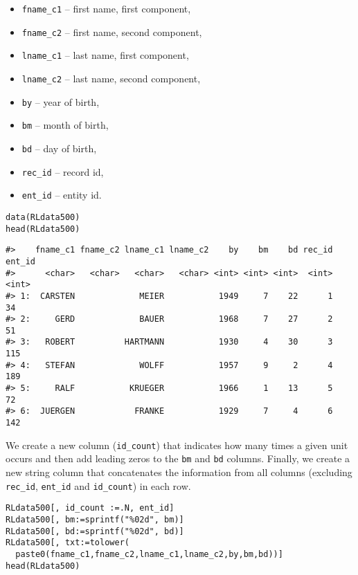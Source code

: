 \begin{itemize}
\tightlist
\item
  \texttt{fname\_c1} -- first name, first component,
\item
  \texttt{fname\_c2} -- first name, second component,
\item
  \texttt{lname\_c1} -- last name, first component,
\item
  \texttt{lname\_c2} -- last name, second component,
\item
  \texttt{by} -- year of birth,
\item
  \texttt{bm} -- month of birth,
\item
  \texttt{bd} -- day of birth,
\item
  \texttt{rec\_id} -- record id,
\item
  \texttt{ent\_id} -- entity id.
\end{itemize}

\begin{verbatim}
data(RLdata500)
head(RLdata500)
\end{verbatim}

\begin{verbatim}
#>    fname_c1 fname_c2 lname_c1 lname_c2    by    bm    bd rec_id ent_id
#>      <char>   <char>   <char>   <char> <int> <int> <int>  <int>  <int>
#> 1:  CARSTEN             MEIER           1949     7    22      1     34
#> 2:     GERD             BAUER           1968     7    27      2     51
#> 3:   ROBERT          HARTMANN           1930     4    30      3    115
#> 4:   STEFAN             WOLFF           1957     9     2      4    189
#> 5:     RALF           KRUEGER           1966     1    13      5     72
#> 6:  JUERGEN            FRANKE           1929     7     4      6    142
\end{verbatim}

We create a new column (\texttt{id\_count}) that indicates how many times a
given unit occurs and then add leading zeros to the \texttt{bm} and \texttt{bd}
columns. Finally, we create a new string column that concatenates the
information from all columns (excluding \texttt{rec\_id}, \texttt{ent\_id} and
\texttt{id\_count}) in each row.

\begin{verbatim}
RLdata500[, id_count :=.N, ent_id]
RLdata500[, bm:=sprintf("%02d", bm)]
RLdata500[, bd:=sprintf("%02d", bd)]
RLdata500[, txt:=tolower(
  paste0(fname_c1,fname_c2,lname_c1,lname_c2,by,bm,bd))]
head(RLdata500)
\end{verbatim}

